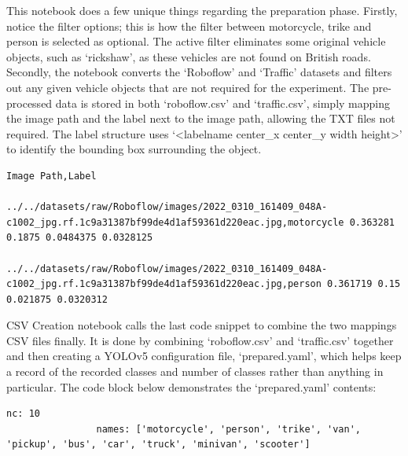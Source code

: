 \documentclass[12pt]{report} %
\begin{document}
			This notebook does a few unique things regarding the preparation phase. Firstly, notice the filter options; this is how the filter between motorcycle, trike and person is selected as optional. The active filter eliminates some original vehicle objects, such as `rickshaw', as these vehicles are not found on British roads. Secondly, the notebook converts the `Roboflow' and `Traffic' datasets and filters out any given vehicle objects that are not required for the experiment. The pre-processed data is stored in both `roboflow.csv' and `traffic.csv', simply mapping the image path and the label next to the image path, allowing the TXT files not required. The label structure uses `<labelname center\_x center\_y width height>' to identify the bounding box surrounding the object.

			\begin{lstlisting}[tabsize=1]
				Image Path,Label
				../../datasets/raw/Roboflow/images/2022_0310_161409_048A-c1002_jpg.rf.1c9a31387bf99de4d1af59361d220eac.jpg,motorcycle 0.363281 0.1875 0.0484375 0.0328125
				../../datasets/raw/Roboflow/images/2022_0310_161409_048A-c1002_jpg.rf.1c9a31387bf99de4d1af59361d220eac.jpg,person 0.361719 0.15 0.021875 0.0320312
			\end{lstlisting}

			CSV Creation notebook calls the last code snippet to combine the two mappings CSV files finally. It is done by combining `roboflow.csv' and `traffic.csv' together and then creating a YOLOv5 configuration file, `prepared.yaml', which helps keep a record of the recorded classes and number of classes rather than anything in particular. The code block below demonstrates the `prepared.yaml' contents:
			\begin{lstlisting}[tabsize=1]
				nc: 10
				names: ['motorcycle', 'person', 'trike', 'van', 'pickup', 'bus', 'car', 'truck', 'minivan', 'scooter']
			\end{lstlisting}
\end{document}
